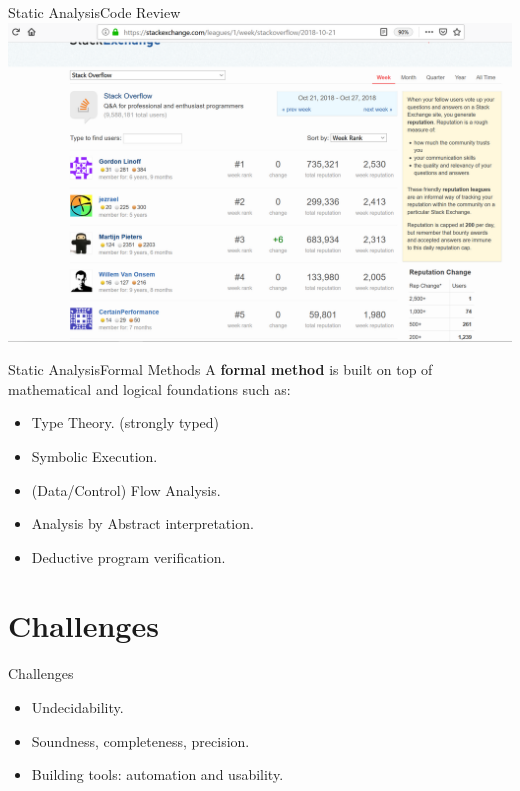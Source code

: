 \begin{frame}{Static Analysis}{Code Review}
	\includegraphics[scale=0.35]{content/images/static-analysis/Static.png}
\end{frame}


\begin{frame}{Static Analysis}{Formal Methods}
A \textbf{formal method} is built on top of mathematical and logical foundations such as:
\begin{itemize}
	\item Type Theory. (strongly typed)
	\item Symbolic Execution.
	\item (Data/Control) Flow Analysis.
	\item Analysis by Abstract interpretation.
	\item Deductive program verification. 
\end{itemize}
\end{frame}


\section{Challenges}
\begin{frame}{Challenges}
\begin{itemize}
	\item Undecidability. 
	\item Soundness, completeness, precision.
	\item Building tools: automation and usability.
\end{itemize}
\end{frame}

